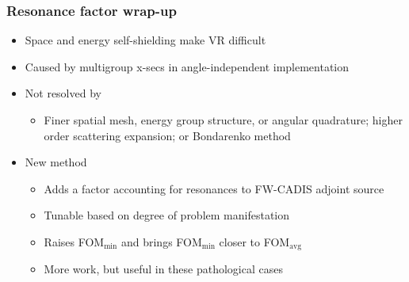 \documentclass[xcolor=x11names,compress, handout]{beamer}
\renewcommand{\(}{\begin{columns}}
\renewcommand{\)}{\end{columns}}
\newcommand{\<}[1]{\begin{column}{#1}}
\renewcommand{\>}{\end{column}}
\begin{document}
\begin{frame}[fragile]
  \frametitle{Resonance factor wrap-up}
  
  \begin{itemize}
  \item Space and energy self-shielding make VR difficult
  
  \item Caused by multigroup x-secs in angle-independent implementation
  
  \item Not resolved by
   \begin{itemize}
   \item Finer spatial mesh, energy group structure, or angular quadrature; higher order scattering expansion; or Bondarenko method
   \end{itemize}
  \pause 
  \item New method
   \begin{itemize}
  	\item Adds a factor accounting for resonances to FW-CADIS adjoint source
  	\item Tunable based on degree of problem manifestation
	\item \alert{Raises FOM$_{\min}$ and brings FOM$_{\min}$ closer to FOM$_{\text{avg}}$}
	\item More work, but useful in these pathological cases
   \end{itemize}
  \end{itemize}

\end{frame}


\end{document}
